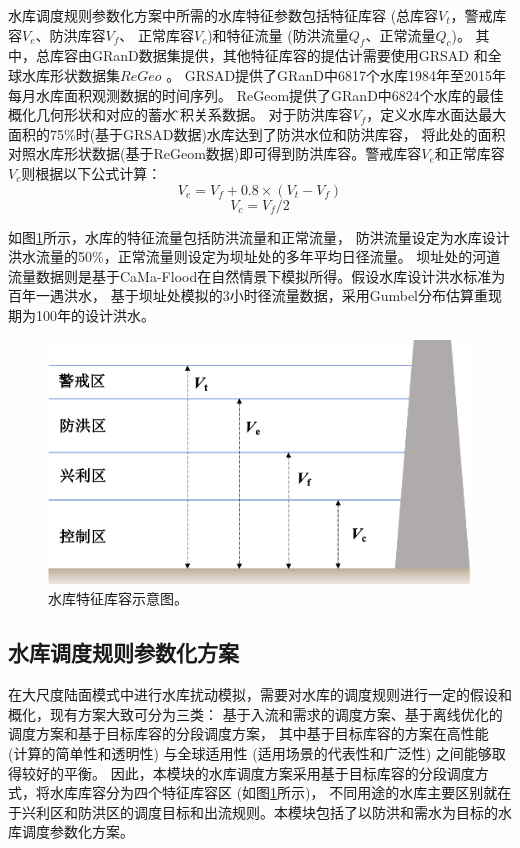 水库调度规则参数化方案中所需的水库特征参数包括特征库容 (总库容$V_t$，警戒库容$V_e$、防洪库容$V_f$、
正常库容$V_c$)和特征流量 (防洪流量$Q_f$、正常流量$Q_c$)。
其中，总库容由GRanD数据集提供，其他特征库容的提估计需要使用GRSAD \citep{zhao2019towards}和全球水库形状数据集$ReGeo$ \citep{yigzaw2018new} 。
GRSAD提供了GRanD中6817个水库1984年至2015年每月水库面积观测数据的时间序列。
ReGeom提供了GRanD中6824个水库的最佳概化几何形状和对应的蓄水\~面积关系数据。
对于防洪库容$V_f$，定义水库水面达最大面积的75\%时(基于GRSAD数据)水库达到了防洪水位和防洪库容，
将此处的面积对照水库形状数据(基于ReGeom数据)即可得到防洪库容。警戒库容$V_e$和正常库容$V_c$则根据以下公式计算：
\begin{equation}
V_{e}=V_{f}+0.8 \times\left(V_{t}-V_{f}\right)
\end{equation}
\begin{equation}
V_{c}=V_{f} / 2
\end{equation}


如图\ref{fig:水库特征库容示意图}所示，水库的特征流量包括防洪流量和正常流量，
防洪流量设定为水库设计洪水流量的50\%，正常流量则设定为坝址处的多年平均日径流量。
坝址处的河道流量数据则是基于CaMa-Flood在自然情景下模拟所得。假设水库设计洪水标准为百年一遇洪水，
基于坝址处模拟的3小时径流量数据，采用Gumbel分布估算重现期为100年的设计洪水\citep{boulange2021}。

{
\begin{figure}[]
\centering
\includegraphics{Figures/陆地表面的水分循环/水库特征库容示意图.png}
\caption{水库特征库容示意图。}
\label{fig:水库特征库容示意图}
\end{figure}
}
\subsection{水库调度规则参数化方案}
在大尺度陆面模式中进行水库扰动模拟，需要对水库的调度规则进行一定的假设和概化，现有方案大致可分为三类：
基于入流和需求的调度方案、基于离线优化的调度方案和基于目标库容的分段调度方案，
其中基于目标库容的方案在高性能 (计算的简单性和透明性) 与全球适用性 (适用场景的代表性和广泛性) 之间能够取得较好的平衡\citep{yassin2019representation}。
因此，本模块的水库调度方案采用基于目标库容的分段调度方式，将水库库容分为四个特征库容区 (如图\ref{fig:水库特征库容示意图}所示)，
不同用途的水库主要区别就在于兴利区和防洪区的调度目标和出流规则。本模块包括了以防洪和需水为目标的水库调度参数化方案。


